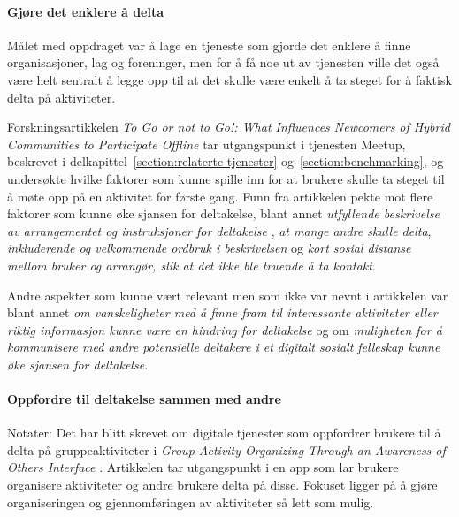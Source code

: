 \paragraph{Gjøre det enklere å delta}
Målet med oppdraget var å lage en tjeneste som gjorde det enklere å finne organisasjoner, lag og foreninger, men for å få noe ut av tjenesten ville det også være helt sentralt å legge opp til at det skulle være enkelt å ta steget for å faktisk delta på aktiviteter. 

Forskningsartikkelen {\em To Go or not to Go!: What Influences Newcomers of Hybrid Communities to Participate Offline} \cite{NEWCOMERS:4:CT17} tar utgangspunkt i tjenesten Meetup, beskrevet i delkapittel~\ref{section:relaterte-tjenester} og~\ref{section:benchmarking}, og undersøkte hvilke faktorer som kunne spille inn for at brukere skulle ta steget til å møte opp på en aktivitet for første gang. Funn fra artikkelen pekte mot flere faktorer som kunne øke sjansen for deltakelse, blant annet {\em utfyllende beskrivelse av arrangementet og instruksjoner for deltakelse
}, {\em at mange andre skulle delta}, {\em inkluderende og velkommende ordbruk i beskrivelsen} og {\em kort sosial distanse mellom bruker og arrangør, slik at det ikke ble truende å ta kontakt}. 

Andre aspekter som kunne vært relevant men som ikke var nevnt i artikkelen var blant annet {\em om vanskeligheter med å finne fram til interessante aktiviteter eller riktig informasjon kunne være en hindring for deltakelse} og om {\em muligheten for å kommunisere med andre potensielle deltakere i et digitalt sosialt felleskap kunne øke sjansen for deltakelse}.

\paragraph{Oppfordre til deltakelse sammen med andre}
Notater:
Det har blitt skrevet om digitale tjenester som oppfordrer brukere til å delta på gruppeaktiviteter i {\em Group-Activity Organizing Through an Awareness-of-Others Interface} \cite{AWARENESS:3:CSCW18}. Artikkelen tar utgangspunkt i en app som lar brukere organisere aktiviteter og andre brukere delta på disse. Fokuset ligger på å gjøre organiseringen og gjennomføringen av aktiviteter så lett som mulig.

